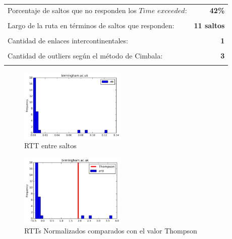 \begin{center}
\begin{tabular}{p{6.5cm}r}
Porcentaje de saltos que no responden los $Time$ $exceeded$: & \textbf{42\%} \\ \\ 
Largo de la ruta en términos de saltos que responden: &\textbf{11 saltos} \\ \\
Cantidad de enlaces intercontinentales: & \textbf{1} \\ \\
Cantidad de outliers según el método de Cimbala: & \textbf{3} \\ \\
\end{tabular}
\end{center}

\begin{figure}[H]
  \centering
    \includegraphics[width=0.45\textwidth]{histogramas_rtt/birmingham-ac-uk.png}
  \caption{RTT entre saltos}
  \label{entropia-s}
\end{figure}

\begin{center}

\end{center}

\begin{figure}[H]
  \centering
    \includegraphics[width=0.45\textwidth]{histogramas_thompson/birmingham-ac-uk.png}
  \caption{RTTs Normalizados comparados con el valor Thompson}
  \label{entropia-s}
\end{figure}

